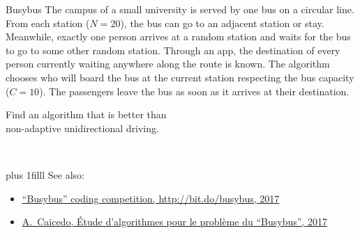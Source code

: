\documentclass[onepage, 12pt]{beamer}
\def\Bottom#1{\vskip 0pt plus 1filll #1}
\begin{document}
%

\begin{frame}[t]{Busybus}{}
    The campus of a small university
    is served by one bus on a circular line.
    From each station ($N = 20$), the bus can go to an adjacent station or stay.
    Meanwhile, exactly one person arrives at a random station
    and waits for the bus to go to some other random station.
    Through an app, the destination of every person currently waiting
    anywhere along the route is known.
    The algorithm chooses who will board the bus at the current station
    respecting the bus capacity ($C = 10$).
    The passengers leave the bus as soon as it arrives at their destination.
    
    \begin{minipage}{0.7\textwidth}
        Find an algorithm that is better than \\
        non-adaptive unidirectional driving.
    \end{minipage}
    \begin{minipage}{0.29\textwidth}
        {\ }
        \centering
    \end{minipage}

    \Bottom{%
        \footnotesize
        See also:
        \begin{itemize}
        \item 
            \href{http://bit.do/busybus}{%
                ``Busybus'' coding competition, http://bit.do/busybus, 2017
            }
        \item
            \href{http://bit.do/ac-rep}{%
                A.~Caicedo, \'Etude d'algorithmes pour le probl\`eme du ``Busybus'', 2017
            }
        \end{itemize}
    }
\end{frame}
\end{document}
